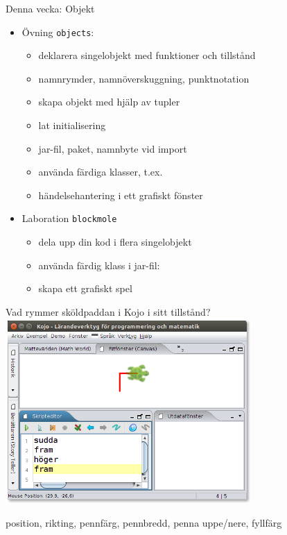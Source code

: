 
\ifkompendium\else
\begin{Slide}{Denna vecka: Objekt}
\begin{itemize}
\item Övning \texttt{objects}:
\begin{itemize}
\item deklarera singelobjekt med funktioner och tillstånd
\item namnrymder, namnöverskuggning, punktnotation
\item skapa objekt med hjälp av tupler
\item lat initialisering
\item jar-fil, paket, namnbyte vid import
\item använda färdiga klasser, t.ex. 
\item händelsehantering i ett grafiskt fönster
\end{itemize}

\item Laboration \texttt{blockmole}
\begin{itemize}
  \item dela upp din kod i flera singelobjekt
  \item använda färdig klass i jar-fil: 
  \item skapa ett grafiskt spel
\end{itemize}
\end{itemize}
\end{Slide}
\fi





\begin{Slide}{Vad rymmer sköldpaddan i Kojo i sitt tillstånd?}
\centering
\includegraphics[width=0.7\textwidth]{../img/kojo}

\pause position, rikting, pennfärg, pennbredd, penna uppe/nere, fyllfärg
\end{Slide}




